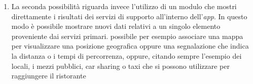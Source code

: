 \begin{itemize}
\begin{enumerate}
		\item
		La seconda possibilità riguarda invece l'utilizzo di un modulo che mostri direttamente i risultati dei servizi di supporto all'interno dell'\emph{app}. In questo modo è possibile mostrare nuovi dati relativi a un singolo elemento proveniente dai servizi primari. \upe possibile per esempio associare una mappa per visualizzare una posizione geografica oppure una segnalazione che indica la distanza o i tempi di percorrenza, oppure, citando sempre l'esempio dei locali, i mezzi pubblici, car sharing o taxi che si possono utilizzare per raggiungere il ristorante
	\end{enumerate}
\end{itemize}